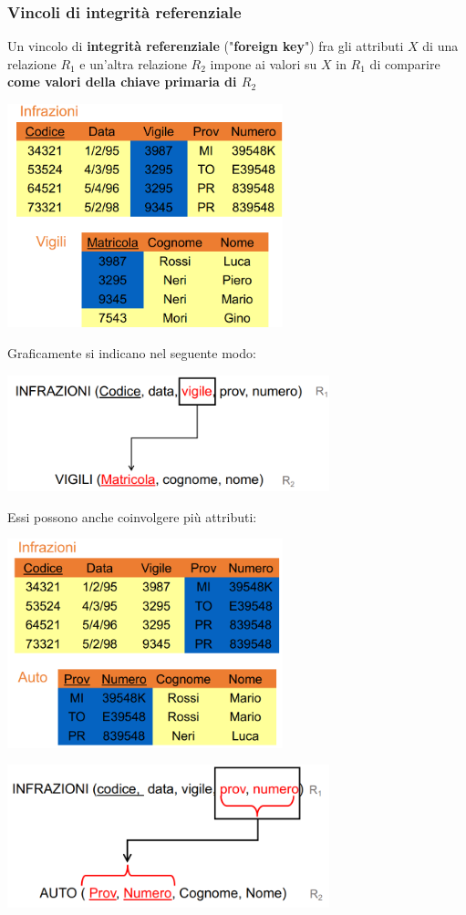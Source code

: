 \documentclass[12pt]{article}
\begin{document}
\subsubsection{Vincoli di integrità referenziale}
Un vincolo di \textbf{integrità referenziale} ("\textbf{foreign key}") fra gli attributi $X$ di una relazione $R_1$ e un'altra relazione $R_2$ impone ai valori su $X$ in $R_1$ di comparire
\textbf{come valori della chiave primaria di $R_2$}
\begin{center}
    \includegraphics[width = 0.60\textwidth]{Images/83.PNG}
\end{center}
Graficamente si indicano nel seguente modo:
\begin{center}
    \includegraphics[width = 0.70\textwidth]{Images/84.PNG}
\end{center}
\newpage
\noindent
Essi possono anche coinvolgere più attributi:
\begin{center}
    \includegraphics[width = 0.60\textwidth]{Images/85.PNG}
\end{center}
\begin{center}
    \includegraphics[width = 0.70\textwidth]{Images/86.PNG}
\end{center}
\end{document}
